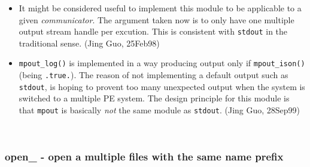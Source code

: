   \begin{itemize}
   \item	It might be considered useful to implement this module to be
  	applicable to a given {\sl communicator}.   The argument
  	taken now is to only have one multiple output stream handle
  	per excution.  This is consistent with \verb"stdout" in the
  	traditional sense. (Jing Guo, 25Feb98)
   \item \verb"mpout_log()" is implemented in a way producing output
  	only if \verb"mpout_ison()" (being \verb".true.").  The reason
  	of not implementing a default output such as \verb"stdout", is
  	hoping to provent too many unexpected output when the system is
  	switched to a multiple PE system.  The design principle for
  	this module is that \verb"mpout" is basically {\sl not} the same
  	module as \verb"stdout". (Jing Guo, 28Sep99)
   \end{itemize}
 
 
\mbox{}\hrulefill\ 
 
  \subsubsection{open\_ - open a multiple files with the same name prefix}

